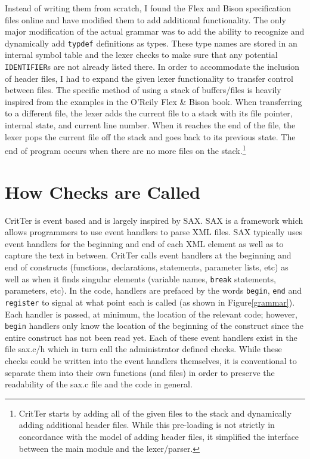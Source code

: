 \documentclass[12pt]{report}
\def\lstlistingname{Figure}
\newcommand{\refCode}{\lstlistingname \hspace{1mm}}
\newcommand{\programName}{CritTer\xspace}
\begin{document}
Instead of writing them from scratch, I found the Flex and Bison specification files 
online\cite{originalGrammar} and have modified them to add additional functionality. The only major 
modification of the actual grammar was to add the ability to recognize and dynamically add 
\lstinline{typdef} definitions as types. These type names are stored in an internal symbol table and the 
lexer checks to make sure that any potential \lstinline{IDENTIFIER}s are not already listed there. In 
order to accommodate the inclusion of header files, I had to expand the given lexer functionality to 
transfer control between files. The specific method of using a stack of buffers/files is heavily inspired 
from the examples in the O'Reily Flex \& Bison book\cite{flex-and-bison}. When transferring to a 
different file, the lexer adds the current file to a stack with its file pointer, internal state, and current line 
number. When it reaches the end of the file, the lexer pops the current file off the stack and goes back 
to its previous state. The end of program occurs when there are no more files on the 
stack.\footnote{\programName starts by adding all of the given files to the stack and dynamically adding 
additional header files. While this pre-loading is not strictly in concordance with the model of adding 
header files, it simplified the interface between the main module and the lexer/parser.} 


\section{How Checks are Called}

\programName is event based and is largely inspired by SAX\cite{saxHomepage}. SAX is a 
framework which allows programmers to use event handlers to parse XML files. SAX typically uses
event handlers for the beginning and end of each XML element as well as to capture the text in 
between. \programName calls event handlers at the beginning and end of constructs (functions, 
declarations, statements, parameter lists, etc) as well as when it finds singular elements (variable 
names, \lstinline{break} statements, parameters, etc). In the code, handlers are prefaced by the words 
\lstinline{begin}, \lstinline{end} and \lstinline{register} to signal at what point each is called (as shown 
in \refCode \ref{grammar}). Each handler is passed, at minimum, the location of the relevant code; 
however, \lstinline{begin} handlers only know the location of the beginning of the construct since the 
entire construct has not been read yet. Each of these event handlers exist in the file sax.c/h which in 
turn call the administrator defined checks. While these checks could be written into the event handlers 
themselves, it is conventional to separate them into their own functions (and files) in order to preserve 
the readability of the sax.c file and the code in general.
\end{document}
